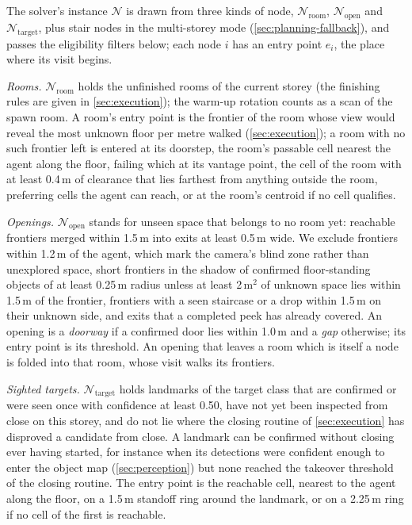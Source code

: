 \documentclass[10pt]{article}
\newcommand{\N}{\mathcal{N}}
\begin{document}
The solver's instance $\N$ is drawn from three kinds of node, $\N_{\mathrm{room}}$, $\N_{\mathrm{open}}$ and $\N_{\mathrm{target}}$, plus stair nodes in the multi-storey mode (\cref{sec:planning-fallback}), and passes the eligibility filters below; each node $i$ has an entry point $e_i$, the place where its visit begins.

\emph{Rooms.} $\N_{\mathrm{room}}$ holds the unfinished rooms of the current storey (the finishing rules are given in \cref{sec:execution}); the warm-up rotation counts as a scan of the spawn room. A room's entry point is the frontier of the room whose view would reveal the most unknown floor per metre walked (\cref{sec:execution}); a room with no such frontier left is entered at its doorstep, the room's passable cell nearest the agent along the floor, failing which at its vantage point, the cell of the room with at least 0.4\,m of clearance that lies farthest from anything outside the room, preferring cells the agent can reach, or at the room's centroid if no cell qualifies.

\emph{Openings.} $\N_{\mathrm{open}}$ stands for unseen space that belongs to no room yet: reachable frontiers merged within 1.5\,m into exits at least 0.5\,m wide. We exclude frontiers within 1.2\,m of the agent, which mark the camera's blind zone rather than unexplored space, short frontiers in the shadow of confirmed floor-standing objects of at least 0.25\,m radius unless at least 2\,m$^2$ of unknown space lies within 1.5\,m of the frontier, frontiers with a seen staircase or a drop within 1.5\,m on their unknown side, and exits that a completed peek has already covered. An opening is a \emph{doorway} if a confirmed door lies within 1.0\,m and a \emph{gap} otherwise; its entry point is its threshold. An opening that leaves a room which is itself a node is folded into that room, whose visit walks its frontiers.

\emph{Sighted targets.} $\N_{\mathrm{target}}$ holds landmarks of the target class that are confirmed or were seen once with confidence at least 0.50, have not yet been inspected from close on this storey, and do not lie where the closing routine of \cref{sec:execution} has disproved a candidate from close. A landmark can be confirmed without closing ever having started, for instance when its detections were confident enough to enter the object map (\cref{sec:perception}) but none reached the takeover threshold of the closing routine. The entry point is the reachable cell, nearest to the agent along the floor, on a 1.5\,m standoff ring around the landmark, or on a 2.25\,m ring if no cell of the first is reachable.
\end{document}
